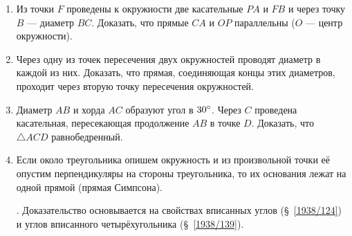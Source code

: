 \documentclass[oneside]{book}
\begin{document}
\begin{enumerate}[resume]
 \item
Из точки $F$ проведены к окружности две касательные $PA$ и $FB$ и через точку $B$ — диаметр $BC$.
Доказать, что прямые $CA$ и $OP$ параллельны ($O$ — центр окружности).

 \item
Через одну из точек пересечения двух окружностей проводят диаметр в каждой из них.
Доказать, что прямая, соединяющая концы этих диаметров, проходит через вторую точку пересечения окружностей.

 \item
Диаметр $AB$ и хорда $AC$ образуют угол в $30\degree$.
Через $C$ проведена касательная, пересекающая продолжение $AB$ в точке $D$.
Доказать, что $\triangle ACD$ равнобедренный.

 \item
Если около треугольника опишем окружность и из произвольной точки её опустим перпендикуляры на стороны треугольника, то их основания лежат на одной прямой (прямая Симпсона).

\smallskip
{}.
Доказательство основывается на свойствах вписанных углов (§~\ref{1938/124}) и углов вписанного четырёхугольника (§~\ref{1938/139}).


\end{enumerate}

\begin{center}
\end{center}
\end{document}
